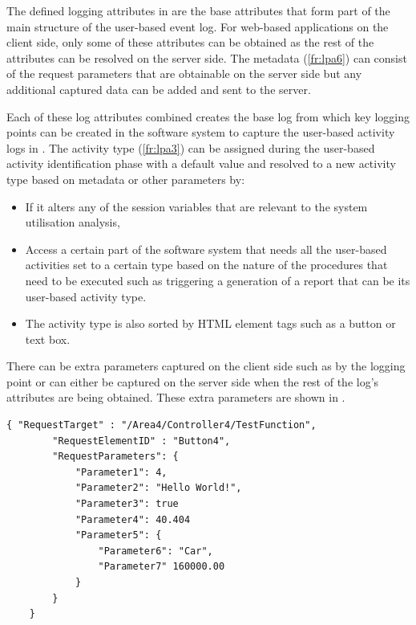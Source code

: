 The defined logging attributes in  are the base attributes that form part of the main structure of the user-based event log. For web-based applications on the client side, only some of these attributes can be obtained as the rest of the attributes can be resolved on the server side. The metadata (\ref{fr:lpa6}) can consist of the request parameters that are obtainable on the server side but any additional captured data can be added and sent to the server.

\clearpage

Each of these log attributes combined creates the base log from which key logging points can be created in the software system to capture the user-based activity logs in . The activity type (\ref{fr:lpa3}) can be assigned during the user-based activity identification phase with a default value and resolved to a new activity type based on metadata or other parameters by:

\begin{itemize}
	\item If it alters any of the session variables that are relevant to the system utilisation analysis,
	\item Access a certain part of the software system that needs all the user-based activities set to a certain type based on the nature of the procedures that need to be executed such as triggering a generation of a report that can be its user-based activity type.
	\item The activity type is also sorted by HTML element tags such as a button or text box.
\end{itemize}

There can be extra parameters captured on the client side such as by the logging point or can either be captured on the server side when the rest of the log's attributes are being obtained. These extra parameters are shown in .

\begin{lstlisting}[style=json, caption={\textit{Metadata JSON}}, label={fig:ch2_MetadataJsonExample}] 
	{ "RequestTarget" : "/Area4/Controller4/TestFunction",
		"RequestElementID" : "Button4",
		"RequestParameters": {
			"Parameter1": 4,
			"Parameter2": "Hello World!",
			"Parameter3": true
			"Parameter4": 40.404
			"Parameter5": {
				"Parameter6": "Car",
				"Parameter7" 160000.00
			}
		}		
	}
\end{lstlisting}

